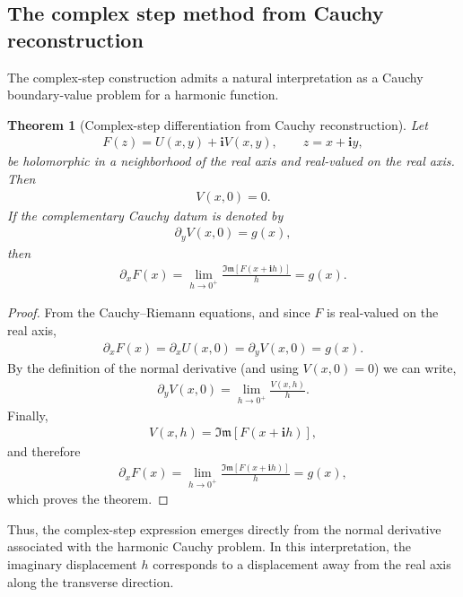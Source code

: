 \documentclass[11pt]{article}
\newtheorem{theorem}{Theorem}[section]
\newcommand{\imag}{\textbf{i}}
\newcommand{\ImagPart}{\mathfrak{Im}}
\begin{document}
	\subsection{The complex step method from Cauchy reconstruction}

The complex-step construction admits a natural interpretation as a Cauchy boundary-value problem for a harmonic function. 

\begin{theorem}[Complex-step differentiation from Cauchy reconstruction]
	Let
	\begin{align*}
		F(z)=U(x,y)+\imag V(x,y),
		\qquad z=x+\imag y,
	\end{align*}
	be holomorphic in a neighborhood of the real axis and real-valued on
	the real axis. Then
	\begin{align*}
		V(x,0)=0.
	\end{align*}
	If the complementary Cauchy datum is denoted by
	\begin{align*}
		\partial_yV(x,0)=g(x),
	\end{align*}
	then
	\begin{align}
		\partial_xF(x)
		=
		\lim_{h\to0^+}
		\frac{\ImagPart[F(x+\imag h)]}{h}
		=
		g(x).
		\label{eq.CS_Cauchy_reconstruction}
	\end{align}
\end{theorem}

\begin{proof}
	From the Cauchy--Riemann equations, and since \(F\) is real-valued
	on the real axis,
	\begin{align*}
		\partial_xF(x)
		=
		\partial_xU(x,0)
		=
		\partial_yV(x,0)
		=
		g(x).
	\end{align*}
	By the definition of the normal derivative (and using  \(V(x,0)=0\)) we can write,
	\begin{align*}
		\partial_yV(x,0)
		=
		\lim_{h\to0^+}
		\frac{V(x,h)}{h}.
	\end{align*}
	Finally,
	\begin{align*}
		V(x,h)
		=
		\ImagPart[F(x+\imag h)],
	\end{align*}
	and therefore
	\begin{align*}
		\partial_xF(x)
		=
		\lim_{h\to0^+}
		\frac{\ImagPart[F(x+\imag h)]}{h}
		=
		g(x),
	\end{align*}
	which proves the theorem.
\end{proof}

Thus, the complex-step expression emerges directly from the normal derivative associated with the harmonic Cauchy problem. In this interpretation, the imaginary displacement $h$ corresponds to a displacement away from the real axis along the transverse direction.
\end{document}
